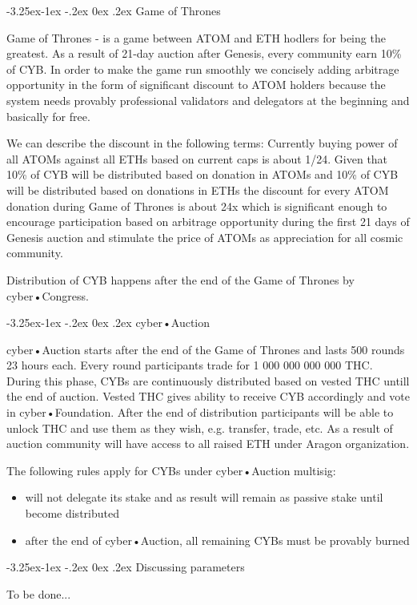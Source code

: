 \documentclass[8pt,oneside]{amsart}
\makeatletter
\renewcommand\subsection{\@startsection{subsection}{2}{\z@}%
                                     {-3.25ex\@plus -1ex \@minus -.2ex}%
                                     {0ex \@plus .2ex}%
                                     {\play\Large}}%
\newcommand{\titleSection}[1]{\subsection{#1}}
\makeatother
\begin{document}
\titleSection{Game of Thrones}\label{got}

Game of Thrones - is a game between ATOM and ETH hodlers for being the greatest. As a result of 21-day auction after Genesis, every community earn 10\% of CYB. In order to make the game run smoothly we concisely adding arbitrage opportunity in the form of significant discount to ATOM holders because the system needs provably professional validators and delegators at the beginning and basically for free.

We can describe the discount in the following terms: Currently buying power of all ATOMs against all ETHs based on current caps is about 1/24. Given that 10\% of CYB will be distributed based on donation in ATOMs and 10\% of CYB will be distributed based on donations in ETHs the discount for every ATOM donation during Game of Thrones is about 24x which is significant enough to encourage participation based on arbitrage opportunity during the first 21 days of Genesis auction and stimulate the price of ATOMs as appreciation for all cosmic community.

Distribution of CYB happens after the end of the Game of Thrones by cyber•Congress.

\titleSection{cyber•Auction}\label{cyberauction}

cyber•Auction starts after the end of the Game of Thrones and lasts 500 rounds 23 hours each. Every round participants trade for 1 000 000 000 000 THC. During this phase, CYBs are continuously distributed based on vested THC untill the end of auction. Vested THC gives ability to receive CYB accordingly and vote in cyber•Foundation. After the end of distribution participants will be able to unlock THC and use them as they wish, e.g. transfer, trade, etc. As a result of auction community will have access to all raised ETH under Aragon organization.

The following rules apply for CYBs under cyber•Auction multisig:

\begin{itemize}
\item will not delegate its stake and as result will remain as passive stake until become distributed
\item after the end of cyber•Auction, all remaining CYBs must be provably burned
\end{itemize}

\titleSection{Discussing parameters}\label{params}

To be done...
\end{document}
